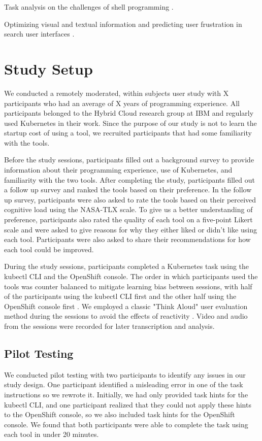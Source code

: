 \documentclass[11pt, oneside]{article}   	%
\begin{document}
Task analysis on the challenges of shell programming \cite{gandhi2020lightening}.

Optimizing visual and textual information and predicting user frustration in search user interfaces \cite{treharne2012optimising, feild2010predicting}.


\section{Study Setup}
We conducted a remotely moderated, within subjects user study with X participants who had an average of X years of programming experience. All participants belonged to the Hybrid Cloud research group at IBM and regularly used Kubernetes in their work. Since the purpose of our study is not to learn the startup cost of using a tool, we recruited participants that had some familiarity with the tools. 

Before the study sessions, participants filled out a background survey to provide information about their programming experience, use of Kubernetes, and familiarity with the two tools. After completing the study, participants filled out a follow up survey and ranked the tools based on their preference. In the follow up survey, participants were also asked to rate the tools based on their perceived cognitive load using the NASA-TLX scale. To give us a better understanding of preference, participants also rated the quality of each tool on a five-point Likert scale and were asked to give reasons for why they either liked or didn’t like using each tool. Participants were also asked to share their recommendations for how each tool could be improved. 

During the study sessions, participants completed a Kubernetes task using the kubectl CLI and the OpenShift console. The order in which participants used the tools was counter balanced to mitigate learning bias between sessions, with half of the participants using the kubectl CLI first and the other half using the OpenShift console first \cite{}. We employed a classic "Think Aloud" user evaluation method during the sessions to avoid the effects of reactivity \cite{}. Video and audio from the sessions were recorded for later transcription and analysis. 

\subsection{Pilot Testing}
We conducted pilot testing with two participants to identify any issues in our study design. One participant identified a misleading error in one of the task instructions so we rewrote it. Initially, we had only provided task hints for the kubectl CLI, and one participant realized that they could not apply these hints to the OpenShift console, so we also included task hints for the OpenShift console. We found that both participants were able to complete the task using each tool in under 20 minutes.
\end{document}
